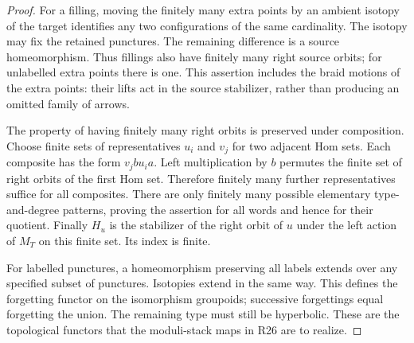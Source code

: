 \begin{proof}
For a filling, moving the finitely many extra points by an ambient
isotopy of the target identifies any two configurations of the same
cardinality. The isotopy may fix the retained punctures. The
remaining difference is a source homeomorphism. Thus fillings
also have finitely many right source orbits; for unlabelled extra
points there is one. This assertion includes the braid motions
of the extra points: their lifts act in the source stabilizer,
rather than producing an omitted family of arrows.

The property of having finitely many right orbits is preserved
under composition. Choose finite sets of representatives $u_i$
and $v_j$ for two adjacent Hom sets. Each composite has the
form $v_j b u_i a$. Left multiplication by $b$ permutes the
finite set of right orbits of the first Hom set. Therefore
finitely many further representatives suffice for all composites.
There are only finitely many possible elementary type-and-degree
patterns, proving the assertion for all words and hence for their
quotient. Finally $H_u$ is the stabilizer of the right orbit of
$u$ under the left action of $M_T$ on this finite set. Its index
is finite.

For labelled punctures, a homeomorphism preserving all labels
extends over any specified subset of punctures. Isotopies extend
in the same way. This defines the forgetting functor on the
isomorphism groupoids; successive forgettings equal forgetting
the union. The remaining type must still be hyperbolic. These
are the topological functors that the moduli-stack maps in R26
are to realize.
\end{proof}

